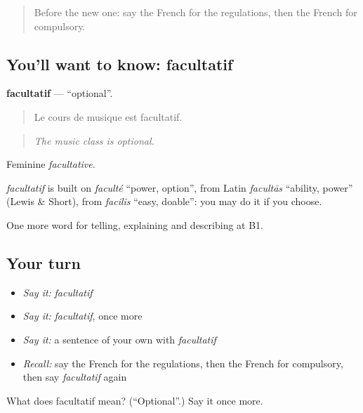 \begin{quote}
Before the new one: say the French for the regulations, then the French for compulsory.
\end{quote}

\subsection*{You'll want to know: facultatif}
\textbf{facultatif} — \textquotedblleft{}optional\textquotedblright{}.

\begin{quote}
Le cours de musique est facultatif.
\end{quote}

\begin{quote}
\emph{The music class is optional.}
\end{quote}

Feminine \emph{facultative}.

\begin{cousinweb}
\emph{facultatif} is built on \emph{faculté} \textquotedblleft{}power, option\textquotedblright{}, from Latin \emph{facultās} \textquotedblleft{}ability, power\textquotedblright{} (Lewis \& Short), from \emph{facilis} \textquotedblleft{}easy, doable\textquotedblright{}: you may do it if you choose.
\end{cousinweb}

\begin{grammarlens}[title={What you've built}]
One more word for telling, explaining and describing at B1.
\end{grammarlens}

\subsection*{Your turn}
\begin{itemize}
\raggedright
  \item \emph{Say it:} \emph{facultatif}
  \item \emph{Say it:} \emph{facultatif}, once more
  \item \emph{Say it:} a sentence of your own with \emph{facultatif}
  \item \emph{Recall:} say the French for the regulations, then the French for compulsory, then say \emph{facultatif} again
\end{itemize}

\begin{tcolorbox}[breakable,colback=teal!4,colframe=teal!35!black,title={Before you move on}]
What does facultatif mean? (\textquotedblleft{}Optional\textquotedblright{}.) Say it once more.
\end{tcolorbox}
